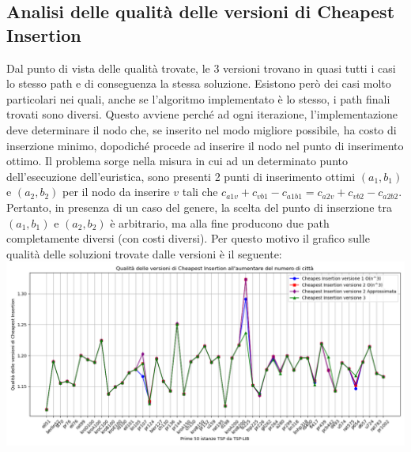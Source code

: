 \documentclass[a4paper,12pt]{report}
\begin{document}
\subsection{Analisi delle qualità delle versioni di Cheapest Insertion}
Dal punto di vista delle qualità trovate, le 3 versioni trovano in quasi tutti i casi lo stesso path e di conseguenza la stessa soluzione. Esistono però dei casi molto particolari nei quali, anche se l'algoritmo implementato è lo stesso, i path finali trovati sono diversi. Questo avviene perché ad ogni iterazione, l'implementazione deve determinare il nodo che, se inserito nel modo migliore possibile, ha costo di inserzione minimo, dopodiché procede ad inserire il nodo nel punto di inserimento ottimo. Il problema sorge nella misura in cui ad un determinato punto dell'esecuzione dell'euristica, sono presenti 2 punti di inserimento ottimi $(a_1, b_1)$ e $(a_2, b_2)$ per il nodo da inserire $v$ tali che $c_{a1v} + c_{vb1} - c_{a1b1} = c_{a2v} + c_{vb2} - c_{a2b2}$. Pertanto, in presenza di un caso del genere, la scelta del punto di inserzione tra $(a_1, b_1)$ e $(a_2, b_2)$ è arbitrario, ma alla fine producono due path completamente diversi (con costi diversi). Per questo motivo il grafico sulle qualità delle soluzioni trovate dalle versioni è il seguente: \newline
\includegraphics[width=1\textwidth]{../Grafici/3.png} \
\end{document}
